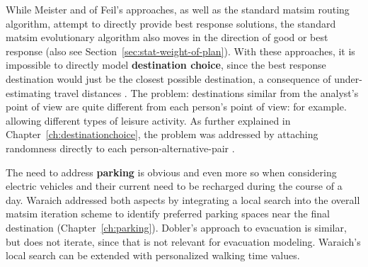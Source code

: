 While Meister and of Feil's approaches, as well as the standard \gls{matsim} routing algorithm, attempt to directly provide best response solutions, the standard \gls{matsim} evolutionary algorithm also moves in the direction of good or best response (also see Section~\ref{sec:stat-weight-of-plan}).  With these approaches, it is impossible to directly model \textbf{destination choice}, since the best response destination would just be the closest possible destination, a consequence of under-estimating travel distances \citep{HorniEtAl_TRR_2009}.  The problem: destinations similar from the analyst's point of view are quite different from each person's point of view: for example. allowing different types of leisure activity.  As further explained in Chapter~\ref{ch:destinationchoice}, the problem was addressed by attaching randomness directly to each person-alternative-pair \citep[also see][]{HorniEtAl_unpub_TRB_2012}.



%

The need to address \textbf{parking} is obvious and even more so when considering electric vehicles and their current need to be recharged during the course of a day. 
Waraich addressed both aspects by 
integrating a local search into the overall \gls{matsim} iteration scheme to identify preferred parking spaces near the final destination (Chapter~\ref{ch:parking}). 
Dobler's approach \citep[][]{Dobler_PhDThesis_2013} to evacuation is similar, but 
does not iterate, since that is not relevant for evacuation modeling.
Waraich's local search can be extended with personalized walking time values.

